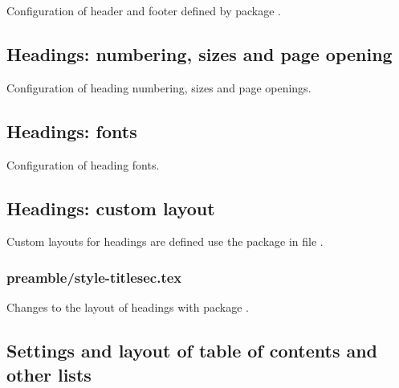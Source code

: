 Configuration of header and footer defined by package . 


\subsection{Headings: numbering, sizes and page opening}

Configuration of heading numbering, sizes and page openings.


\subsection{Headings: fonts}

Configuration of heading fonts.


\subsection{Headings: custom layout}

Custom layouts for headings are defined use the package  in file .


\subsubsection{preamble/style-titlesec.tex}

Changes to the layout of headings with package . 


\subsection{Settings and layout of table of contents and other lists}


